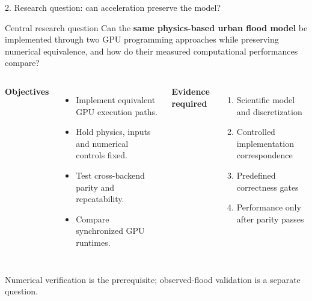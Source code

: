 \documentclass[aspectratio=169,10pt]{beamer}
\newcommand{\tightitem}{\setlength\itemsep{2pt}\setlength\parskip{0pt}}
\begin{document}
\begin{frame}{2. Research question: can acceleration preserve the model?}
\begin{block}{Central research question}
Can the \textbf{same physics-based urban flood model} be implemented through two GPU
programming approaches while preserving numerical equivalence, and how do their measured
computational performances compare?
\end{block}

\vspace{3mm}
\begin{columns}[T,onlytextwidth]
\textbf{Objectives}
\begin{itemize}\tightitem
\item Implement equivalent GPU execution paths.
\item Hold physics, inputs and numerical controls fixed.
\item Test cross-backend parity and repeatability.
\item Compare synchronized GPU runtimes.
\end{itemize}
\textbf{Evidence required}
\begin{enumerate}\tightitem
\item Scientific model and discretization
\item Controlled implementation correspondence
\item Predefined correctness gates
\item Performance only after parity passes
\end{enumerate}
\end{columns}

\vspace{3mm}
\centering\small Numerical verification is the prerequisite; observed-flood validation is a separate question.
\end{frame}
\end{document}
